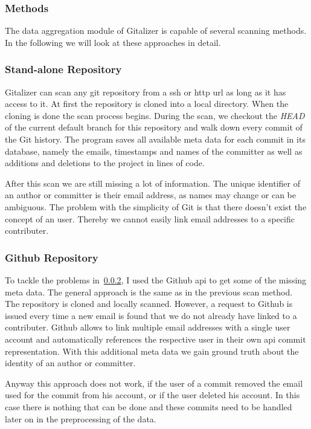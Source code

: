 \subsubsection{Methods}
The data aggregation module of Gitalizer is capable of several scanning methods.
In the following we will look at these approaches in detail.

\subsubsection{Stand-alone Repository}\label{stand-alone-repository-scan}
Gitalizer can scan any git repository from a \ac{ssh} or \ac{http} \acs{url} as long as it has access to it.
At first the repository is cloned into a local directory.
When the cloning is done the scan process begins.
During the scan, we checkout the \emph{HEAD} of the current default branch for this repository and walk down every commit of the Git history.
The program saves all available meta data for each commit in its database, namely the emails, timestamps and names of the committer as well as additions and deletions to the project in lines of code.

After this scan we are still missing a lot of information.
The unique identifier of an author or committer is their email address, as names may change or can be ambiguous.
The problem with the simplicity of Git is that there doesn't exist the concept of an user.
Thereby we cannot easily link email addresses to a specific contributer.


\subsubsection{Github Repository}\label{github-repo-scan}
To tackle the problems in~\ref{stand-alone-repository-scan}, I used the Github \ac{api} to get some of the missing meta data.
The general approach is the same as in the previous scan method. The repository is cloned and locally scanned.
However, a request to Github is issued every time a new email is found that we do not already have linked to a contributer.
Github allows to link multiple email addresses with a single user account and automatically references the respective user in their own \ac{api} commit representation.
With this additional meta data we gain ground truth about the identity of an author or committer.

Anyway this approach does not work, if the user of a commit removed the email used for the commit from his account, or if the user deleted his account.
In this case there is nothing that can be done and these commits need to be handled later on in the preprocessing of the data.


